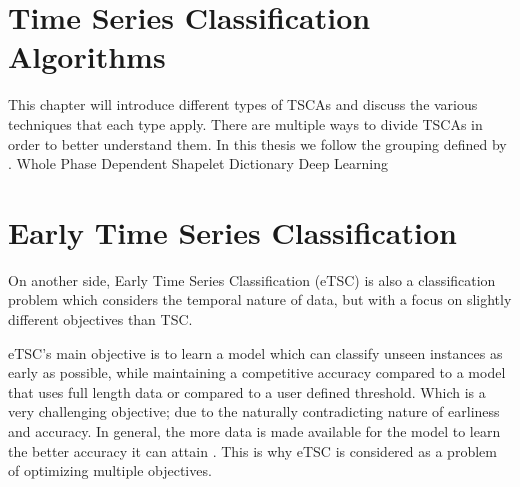 \section{Time Series Classification Algorithms}
\label{SectionTSCA}
This chapter will introduce different types of TSCAs and discuss the various techniques that each type apply.
There are multiple ways to divide TSCAs in order to better understand them.
In this thesis we follow the grouping defined by \cite{bagnall2017great}.
{Whole}
{Phase Dependent}
{Shapelet}
{Dictionary}
{Deep Learning}

\section{Early Time Series Classification}
\label{EarlyTimeSeriesClassification}
On another side, Early Time Series Classification (eTSC) is also a classification problem which considers the temporal nature of data,
but with a focus on slightly different objectives than TSC.

eTSC's main objective is to learn a model which can classify unseen instances as early as possible,
while maintaining a competitive accuracy compared to a model that uses full length data or compared to a user defined threshold\cite{xing2009early}.
Which is a very challenging objective; due to the naturally contradicting nature of earliness and accuracy.
In general, the more data is made available for the model to learn the better accuracy it can attain \cite{mori2019early,tavenard2016cost,xing2012early,mori2017reliable}.
This is why eTSC is considered as a problem of optimizing multiple objectives.

